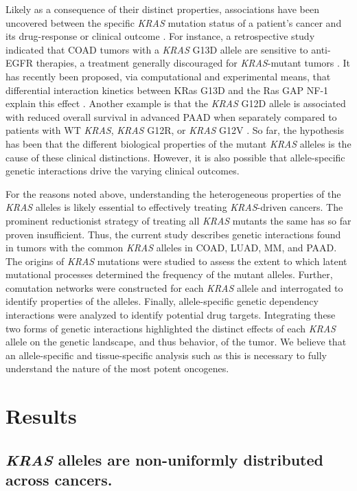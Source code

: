 \documentclass[english, 10pt, letterpaper]{article}
\newcommand{\KRAS}{\emph{KRAS}}
\newcommand{\kras}{KRas}
\begin{document}
Likely as a consequence of their distinct properties, associations have been uncovered between the specific \KRAS{} mutation status of a patient's cancer and its drug-response or clinical outcome \cite{Haigis2017, Li2018}.
For instance, a retrospective study indicated that COAD tumors with a \KRAS{} G13D allele are sensitive to anti-EGFR therapies, a treatment generally discouraged for \KRAS{}-mutant tumors \cite{DeRoock2010}. 
It has recently been proposed, via computational and experimental means, that differential interaction kinetics between \kras{} G13D and the Ras GAP NF-1 explain this effect \cite{McFall2019, Rabara2019, Zafra2019}.
Another example is that the \KRAS{} G12D allele is associated with reduced overall survival in advanced PAAD when separately compared to patients with WT \KRAS{}, \KRAS{} G12R, or \KRAS{} G12V \cite{Bournet2016}.
So far, the hypothesis has been that the different biological properties of the mutant \KRAS{} alleles is the cause of these clinical distinctions.
However, it is also possible that allele-specific genetic interactions drive the varying clinical outcomes.

For the reasons noted above, understanding the heterogeneous properties of the \KRAS{} alleles is likely essential to effectively treating \KRAS{}-driven cancers.
The prominent reductionist strategy of treating all \KRAS{} mutants the same has so far proven insufficient.
Thus, the current study describes genetic interactions found in tumors with the common \KRAS{} alleles in COAD, LUAD, MM, and PAAD.
The origins of \KRAS{} mutations were studied to assess the extent to which latent mutational processes determined the frequency of the mutant alleles.
Further, comutation networks were constructed for each \KRAS{} allele and interrogated to identify properties of the alleles.
Finally, allele-specific genetic dependency interactions were analyzed to identify potential drug targets.
Integrating these two forms of genetic interactions highlighted the distinct effects of each \KRAS{} allele on the genetic landscape, and thus behavior, of the tumor.
We believe that an allele-specific and tissue-specific analysis such as this is necessary to fully understand the nature of the most potent oncogenes.



\section*{Results}

\subsection*{\KRAS{} alleles are non-uniformly distributed across cancers.}
\end{document}
